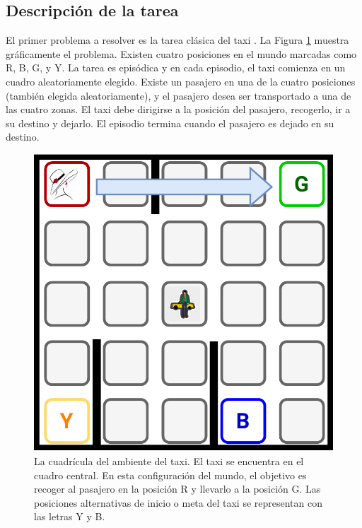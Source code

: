 \subsection{Descripción de la tarea}

El primer problema a resolver es la tarea clásica del taxi \cite{Dietterich:2000:HRL:1622262.1622268}.
La Figura \ref{fig:taxi} muestra gráficamente el problema.
Existen cuatro posiciones en el mundo marcadas como R, B, G, y Y. 
La tarea es episódica y en cada episodio, 
el taxi comienza en un cuadro aleatoriamente elegido. 
Existe un pasajero en una de la cuatro posiciones (también elegida
aleatoriamente), y el pasajero desea ser transportado a una de las
cuatro zonas.
El taxi debe dirigirse a la posición del pasajero, recogerlo, ir a su destino y dejarlo.
El episodio termina cuando el pasajero es dejado en su destino.

\begin{figure}[H]
    \centering
    \includegraphics[scale=0.2]{Chapter5/Figs/taxi-env.pdf}
    \caption{La cuadrícula del ambiente del taxi. El taxi se encuentra en el cuadro central. En esta configuración del mundo, el objetivo es recoger al pasajero en la posición R y llevarlo a la posición G. Las posiciones alternativas de inicio o meta  del taxi
    se representan con las letras Y y B.}
    \label{fig:taxi}
\end{figure}

